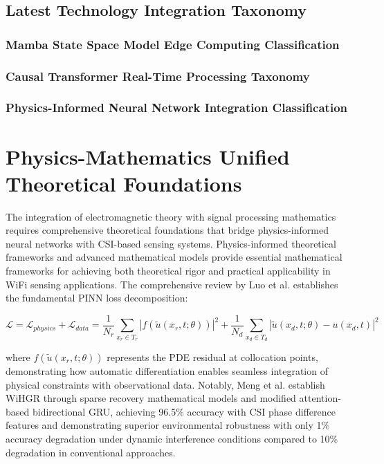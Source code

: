 \documentclass[journal]{IEEEtran}
\begin{document}
\subsection{Latest Technology Integration Taxonomy}
\subsubsection{Mamba State Space Model Edge Computing Classification}
\subsubsection{Causal Transformer Real-Time Processing Taxonomy}
\subsubsection{Physics-Informed Neural Network Integration Classification}

\section{Physics-Mathematics Unified Theoretical Foundations}
\label{sec:physics_theory}

The integration of electromagnetic theory with signal processing mathematics requires
comprehensive theoretical foundations that bridge physics-informed neural networks
with CSI-based sensing systems. Physics-informed theoretical frameworks \cite{chen2018wifi,de2024numerical,kong2025autovit,luo2024vision,luo2025physics}
and advanced mathematical models \cite{meng2021wihgr,olivares2021applications,raissi2019physics,ratnam2024optimal,shi2023simplified} provide
essential mathematical frameworks for achieving both theoretical rigor and practical
applicability in WiFi sensing applications. The comprehensive review by Luo et al. \cite{luo2025physics} establishes the fundamental PINN loss decomposition:

\begin{equation}
\mathcal{L} = \mathcal{L}_{physics} + \mathcal{L}_{data} = \frac{1}{N_r}\sum_{x_r \in T_r}|f(\tilde{u}(x_r, t; \theta))|^2 + \frac{1}{N_d}\sum_{x_d \in T_d}|\tilde{u}(x_d, t; \theta) - u(x_d, t)|^2
\label{eq:luo_pinn_framework}
\end{equation}

where $f(\tilde{u}(x_r, t; \theta))$ represents the PDE residual at collocation points, demonstrating how automatic differentiation enables seamless integration of physical constraints with observational data. Notably, Meng et al. \cite{meng2021wihgr} establish WiHGR through sparse recovery mathematical models and modified attention-based bidirectional GRU, achieving 96.5\% accuracy with CSI phase difference features and demonstrating superior environmental robustness with only 1\% accuracy degradation under dynamic interference conditions compared to 10\% degradation in conventional approaches.
\end{document}
